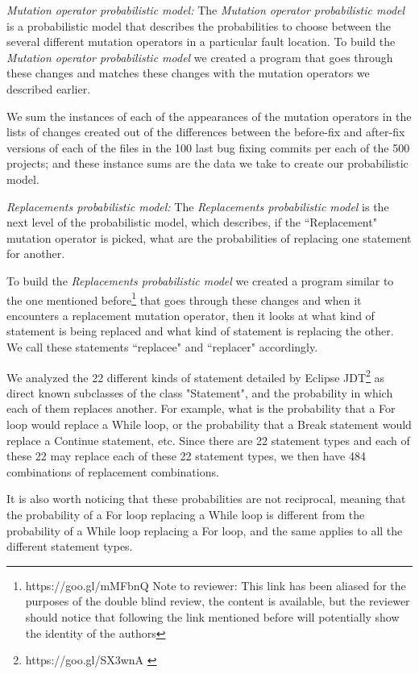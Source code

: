 \documentclass[conference]{IEEEtran}
\begin{document}
\emph{Mutation operator probabilistic model:}
The \textit{Mutation operator probabilistic model} is a probabilistic model that 
describes the probabilities to choose between the several different mutation 
operators in a particular fault location.
%
To build the \textit{Mutation operator probabilistic model} we created 
a program that goes through these 
changes and matches these changes with the mutation operators we described 
earlier.

We sum the instances of each of the appearances of the mutation operators in the 
lists of changes created out of the differences between the before-fix and 
after-fix versions of each of the files in the 100 last bug fixing commits per 
each of the 500 projects; and these instance sums are the data we take to create 
our probabilistic model.

\emph{Replacements probabilistic model:}
The \textit{Replacements probabilistic model} is the next level of the 
probabilistic model, which describes, if the ``Replacement" mutation operator is 
picked, what are the probabilities of replacing one statement for another. 

To build the \textit{Replacements probabilistic model} we created a 
program similar to the one mentioned before\footnote{https://goo.gl/mMFbnQ
Note to reviewer: This link has been aliased for the purposes of the double 
blind review, the content is available, but the reviewer should notice that 
following the link mentioned before will potentially show the identity of the authors} that 
goes through these 
changes and when it encounters a  replacement mutation operator, then it looks 
at what kind of statement is being 
replaced and what kind of statement is replacing the other. We call these 
statements ``replacee" and ``replacer" accordingly.


We analyzed the 22 different kinds of statement detailed by Eclipse JDT\footnote{https://goo.gl/SX3wnA \label{stmtNames}} as
direct known subclasses of the class "Statement", and the probability in which
each of  
them replaces another. For example, what is the probability that a For loop 
would replace a While loop, or the probability that a Break statement would 
replace a Continue statement, etc. Since there are 22 statement types and each of these 22 may 
replace each of these 22 statement types, we then have 484 combinations of 
replacement combinations.

It is also worth noticing that these probabilities are not reciprocal, meaning 
that the probability of a For loop replacing a While loop is different from the 
probability of a While loop replacing a For loop, and the same applies to all 
the different statement types.
\end{document}
